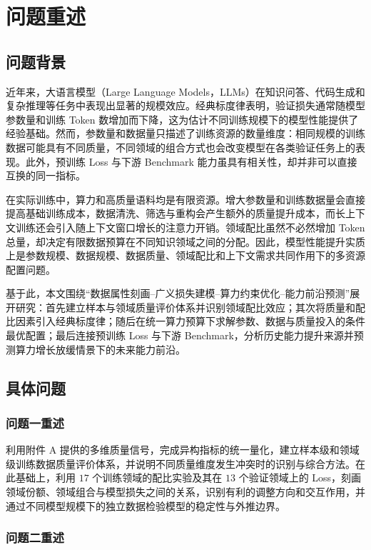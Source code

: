 \section{问题重述}

\subsection{问题背景}

近年来，大语言模型（Large Language Models，LLMs）在知识问答、代码生成和复杂推理等任务中表现出显著的规模效应。经典标度律表明，验证损失通常随模型参数量和训练 Token 数增加而下降，这为估计不同训练规模下的模型性能提供了经验基础。然而，参数量和数据量只描述了训练资源的数量维度：相同规模的训练数据可能具有不同质量，不同领域的组合方式也会改变模型在各类验证任务上的表现。此外，预训练 Loss 与下游 Benchmark 能力虽具有相关性，却并非可以直接互换的同一指标。

在实际训练中，算力和高质量语料均是有限资源。增大参数量和训练数据量会直接提高基础训练成本，数据清洗、筛选与重构会产生额外的质量提升成本，而长上下文训练还会引入随上下文窗口增长的注意力开销。领域配比虽然不必然增加 Token 总量，却决定有限数据预算在不同知识领域之间的分配。因此，模型性能提升实质上是参数规模、数据规模、数据质量、领域配比和上下文需求共同作用下的多资源配置问题。

基于此，本文围绕“数据属性刻画--广义损失建模--算力约束优化--能力前沿预测”展开研究：首先建立样本与领域质量评价体系并识别领域配比效应；其次将质量和配比因素引入经典标度律；随后在统一算力预算下求解参数、数据与质量投入的条件最优配置；最后连接预训练 Loss 与下游 Benchmark，分析历史能力提升来源并预测算力增长放缓情景下的未来能力前沿。

\subsection{具体问题}

\subsubsection{问题一重述}

利用附件 A 提供的多维质量信号，完成异构指标的统一量化，建立样本级和领域级训练数据质量评价体系，并说明不同质量维度发生冲突时的识别与综合方法。在此基础上，利用 $17$ 个训练领域的配比实验及其在 $13$ 个验证领域上的 Loss，刻画领域份额、领域组合与模型损失之间的关系，识别有利的调整方向和交互作用，并通过不同模型规模下的独立数据检验模型的稳定性与外推边界。

\subsubsection{问题二重述}

